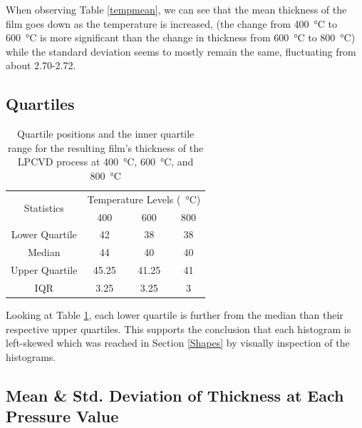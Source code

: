 \documentclass[letterpaper]{article}
\begin{document}
When observing Table \ref{tempmean}, we can see that the mean thickness of the film goes down as the temperature
is increased, (the change from \SI{400}{\celsius} to \SI{600}{\celsius} is more significant than the change in thickness from \SI{600}{\celsius} to \SI{800}{\celsius}) while the standard deviation seems to mostly remain the same,
fluctuating from about 2.70-2.72.

\subsection{Quartiles}

\begin{table}[H]
 \centering
 \begin{tabular}{c|c|c|c|}
  \multirow{2}{*}{Statistics} & \multicolumn{3}{c|}{Temperature Levels (\SI{}{\celsius})}               \\ \cline{2-4}
                              & 400                                                       & 600   & 800 \\ \hline
  Lower Quartile              & 42                                                        & 38    & 38  \\ \hline
  Median                      & 44                                                        & 40    & 40  \\ \hline
  Upper Quartile              & 45.25                                                     & 41.25 & 41  \\ \hline
  IQR                         & 3.25                                                      & 3.25  & 3   \\ \hline
 \end{tabular}
 \caption{Quartile positions and the inner quartile range for the resulting film's thickness of the LPCVD process at \SI{400}{\celsius}, \SI{600}{\celsius}, and \SI{800}{\celsius}}
 \label{tempquart}
\end{table}

Looking at Table \ref{tempquart}, each lower quartile is further from the median than their respective
upper quartiles. This supports the conclusion that each histogram is left-skewed
which was reached in Section \ref{Shapes} by visually inspection of the histograms.
\subsection{Mean \& Std. Deviation of Thickness at Each Pressure Value}
\end{document}
